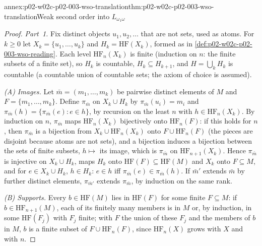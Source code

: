 \begin{annexitem}{annex:p02-w02c-p02-003-wso-translation}{thm:p02-w02c-p02-003-wso-translation}{Weak second order into \(L_{\omega_1\omega}\)}
\begin{proof}
\emph{Part~1.}  Fix distinct objects \(u_1,u_2,\ldots\) that are not sets,
used as atoms.  For \(k\geq0\) let \(X_k=\{u_1,\ldots,u_k\}\) and
\(H_k=\mathrm{HF}(X_k)\), formed as in
\cref{def:p02-w02c-p02-003-wso-reading}.  Each level
\(\mathrm{HF}_n(X_k)\) is finite (induction on \(n\): the finite subsets of a
finite set), so \(H_k\) is countable, \(H_k\subseteq H_{k+1}\), and
\(H=\bigcup_k H_k\) is countable (a countable union of countable sets; the
axiom of choice is assumed).

\emph{(A) Images.}  Let \(\bar m=(m_1,\ldots,m_k)\) be pairwise distinct
elements of \(M\) and \(F=\{m_1,\ldots,m_k\}\).  Define
\(\pi_{\bar m}\) on \(X_k\cup H_k\) by \(\pi_{\bar m}(u_i)=m_i\) and
\(\pi_{\bar m}(h)=\{\pi_{\bar m}(e):e\in h\}\), by recursion on the least
\(n\) with \(h\in\mathrm{HF}_n(X_k)\).  By induction on \(n\),
\(\pi_{\bar m}\) maps \(\mathrm{HF}_n(X_k)\) bijectively onto
\(\mathrm{HF}_n(F)\): if this holds for \(n\), then \(\pi_{\bar m}\) is a
bijection from \(X_k\cup\mathrm{HF}_n(X_k)\) onto \(F\cup\mathrm{HF}_n(F)\)
(the pieces are disjoint because atoms are not sets), and a bijection
induces a bijection between the sets of finite subsets, \(h\mapsto\) its
image, which is \(\pi_{\bar m}\) on \(\mathrm{HF}_{n+1}(X_k)\).  Hence
\(\pi_{\bar m}\) is injective on \(X_k\cup H_k\), maps \(H_k\) onto
\(\mathrm{HF}(F)\subseteq\mathrm{HF}(M)\) and \(X_k\) onto \(F\subseteq M\),
and for \(e\in X_k\cup H_k\), \(h\in H_k\): \(e\in h\) iff
\(\pi_{\bar m}(e)\in\pi_{\bar m}(h)\).  If \(\bar m'\) extends \(\bar m\)
by further distinct elements, \(\pi_{\bar m'}\) extends \(\pi_{\bar m}\),
by induction on the same rank.

\emph{(B) Supports.}  Every \(b\in\mathrm{HF}(M)\) lies in \(\mathrm{HF}(F)\)
for some finite \(F\subseteq M\): if \(b\in\mathrm{HF}_{n+1}(M)\), each of
its finitely many members is in \(M\) or, by induction, in some
\(\mathrm{HF}(F_j)\) with \(F_j\) finite; with \(F\) the union of these
\(F_j\) and the members of \(b\) in \(M\), \(b\) is a finite subset of
\(F\cup\mathrm{HF}_n(F)\), since \(\mathrm{HF}_n(X)\) grows with \(X\) and
with \(n\).


\end{proof}
\end{annexitem}
